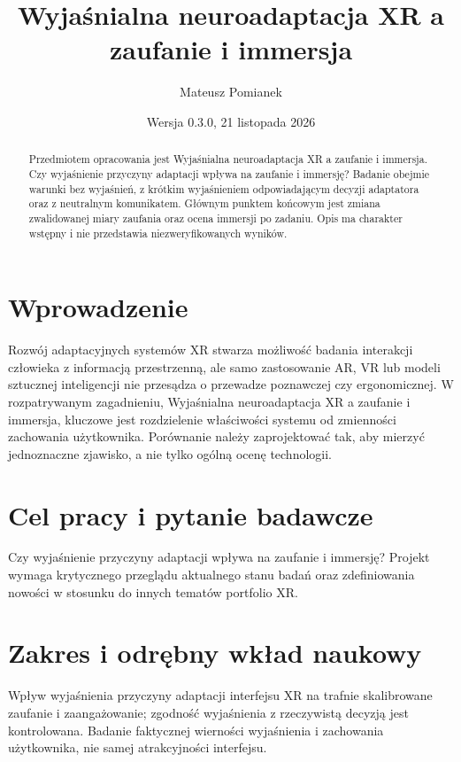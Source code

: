 \documentclass[11pt,a4paper]{article}
\title{Wyjaśnialna neuroadaptacja XR a zaufanie i immersja}
\author{Mateusz Pomianek}
\date{Wersja 0.3.0, 21 listopada 2026}
\begin{document}
\maketitle

\begin{abstract}

Przedmiotem opracowania jest Wyjaśnialna neuroadaptacja XR a zaufanie i immersja. Czy wyjaśnienie przyczyny adaptacji wpływa na zaufanie i immersję? Badanie obejmie warunki bez wyjaśnień, z krótkim wyjaśnieniem odpowiadającym decyzji adaptatora oraz z neutralnym komunikatem. Głównym punktem końcowym jest zmiana zwalidowanej miary zaufania oraz ocena immersji po zadaniu. Opis ma charakter wstępny i nie przedstawia niezweryfikowanych wyników.

\end{abstract}

\section{Wprowadzenie}

Rozwój adaptacyjnych systemów XR stwarza możliwość badania interakcji człowieka z informacją przestrzenną, ale samo zastosowanie AR, VR lub modeli sztucznej inteligencji nie przesądza o przewadze poznawczej czy ergonomicznej. W rozpatrywanym zagadnieniu, Wyjaśnialna neuroadaptacja XR a zaufanie i immersja, kluczowe jest rozdzielenie właściwości systemu od zmienności zachowania użytkownika. Porównanie należy zaprojektować tak, aby mierzyć jednoznaczne zjawisko, a nie tylko ogólną ocenę technologii.

\section{Cel pracy i pytanie badawcze}

Czy wyjaśnienie przyczyny adaptacji wpływa na zaufanie i immersję? Projekt wymaga krytycznego przeglądu aktualnego stanu badań oraz zdefiniowania nowości w stosunku do innych tematów portfolio XR.

\section{Zakres i odrębny wkład naukowy}
Wpływ wyjaśnienia przyczyny adaptacji interfejsu XR na trafnie skalibrowane zaufanie i zaangażowanie; zgodność wyjaśnienia z rzeczywistą decyzją jest kontrolowana. Badanie faktycznej wierności wyjaśnienia i zachowania użytkownika, nie samej atrakcyjności interfejsu.
\end{document}
